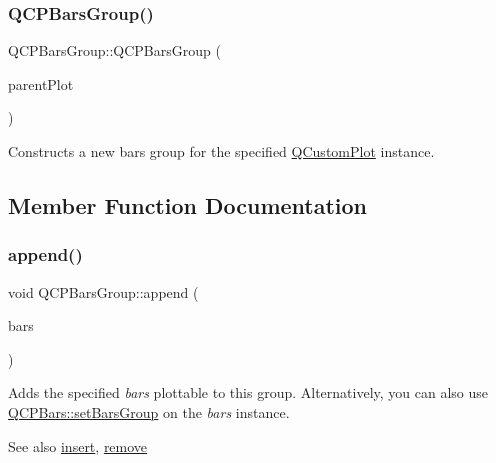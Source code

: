 \subsubsection{\texorpdfstring{Q\+C\+P\+Bars\+Group()}{QCPBarsGroup()}}
{\footnotesize\ttfamily Q\+C\+P\+Bars\+Group\+::\+Q\+C\+P\+Bars\+Group (\begin{DoxyParamCaption}\item[{\mbox{\hyperlink{class_q_custom_plot}{Q\+Custom\+Plot}} $\ast$}]{parent\+Plot }\end{DoxyParamCaption})}

Constructs a new bars group for the specified \mbox{\hyperlink{class_q_custom_plot}{Q\+Custom\+Plot}} instance. 

\subsection{Member Function Documentation}
\mbox{\label{class_q_c_p_bars_group_a809ed63cc4ff7cd5b0b8c96b470163d3}} 
\subsubsection{\texorpdfstring{append()}{append()}}
{\footnotesize\ttfamily void Q\+C\+P\+Bars\+Group\+::append (\begin{DoxyParamCaption}\item[{\mbox{\hyperlink{class_q_c_p_bars}{Q\+C\+P\+Bars}} $\ast$}]{bars }\end{DoxyParamCaption})}

Adds the specified {\itshape bars} plottable to this group. Alternatively, you can also use \mbox{\hyperlink{class_q_c_p_bars_aedd1709061f0b307c47ddb45e172ef9a}{Q\+C\+P\+Bars\+::set\+Bars\+Group}} on the {\itshape bars} instance.

\begin{DoxySeeAlso}{See also}
\mbox{\hyperlink{class_q_c_p_bars_group_a309a5f7233db189f3ea9c2d04ece6c13}{insert}}, \mbox{\hyperlink{class_q_c_p_bars_group_a215e28a5944f1159013a0e19169220e7}{remove}} 
\end{DoxySeeAlso}
\mbox{\label{class_q_c_p_bars_group_a6e4f4e86abbec6a9342f204ef82abef8}} 
